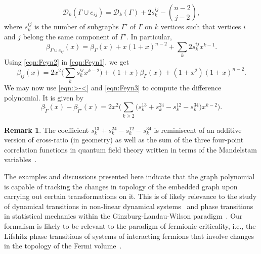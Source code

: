 \documentclass[10pt, reqno]{amsart}
\newcommand{\hf}{\hspace*{0.5cm}}
\theoremstyle{plain}
\theoremstyle{remark}
\theoremstyle{definition}
\newtheorem{rem}[theorem]{Remark}
\numberwithin{equation}{section}
\begin{document}
\begin{equation*}
\mathcal{D}_k(\Gamma\cup e_{ij})=\mathcal{D}_k(\Gamma)+2s^{ij}_k-{n-2 \choose j-2},
\end{equation*}
where $s_k^{ij}$ is the number of subgraphs $\Gamma'$ of $\Gamma$ on $k$ vertices such that vertices $i$ and $j$ belong the same component of $\Gamma'$. In particular, 
\begin{equation}\label{eqn:Feyn2}
{\beta}_{\Gamma\cup e_{ij}}(x)={\beta}_\Gamma(x)+x(1+x)^{n-2}+\sum_k 2s_k^{ij}x^{k-1}.
\end{equation}
Using \eqref{eqn:Feyn2} in \eqref{eqn:Feyn1}, we get
\begin{equation}\label{eqn:Feyn3}
{\beta}_{ij}(x)=2x^2\Big(\sum_k s_k^{ij} x^{k-2}\Big)+(1+x){\beta}_\Gamma(x)+(1+x^2)(1+x)^{n-2}.
\end{equation}
We may now use \eqref{eqn:>-<} and \eqref{eqn:Feyn3} to compute the difference polynomial. It is given by
\begin{equation*}\label{eqn:diff-poly}
{\beta}_{\tilde{\Gamma}}(x)-{\beta}_{\tilde{\Gamma}'}(x)=2x^2\Big(\sum_{k\geq 2} \big(s_k^{13}+ s_k^{24}-s_k^{12}-s_k^{34}\big)x^{k-2}\Big).
\end{equation*}
\begin{rem}
The coefficient $s_k^{13}+ s_k^{24}-s_k^{12}-s_k^{34}$ is reminiscent of an additive version of cross-ratio (in geometry) as well as the sum of the three four-point correlation functions in quantum field theory written in terms of the Mandelstam variables~\cite{peskinschroeder}. 
\end{rem}
\hf The examples and discussions presented here indicate that the graph polynomial is capable of tracking the changes in topology of the embedded graph upon carrying out certain transformations on it. This is of likely relevance to the study of dynamical transitions in non-linear dynamical systems~\cite{strogatz2018nonlinear,bhattacharjee2017topology} and phase transitions in statistical mechanics within the Ginzburg-Landau-Wilson paradigm~\cite{kardartext}. Our formalism is likely to be relevant to the paradigm of fermionic criticality, i.e., the Lifshitz phase transitions of systems of interacting fermions that involve changes in the topology of the Fermi volume~\cite{lifshitz1960,volovik2007,volovik2017,anirbanurg1,anirbanurg2,anirbanmotti,anirbanmott2,MukherjeeTLL,siddharthacpi,MukherjeeKondo2022,mukherjeeMERG2022,pal2019}.
\end{document}
